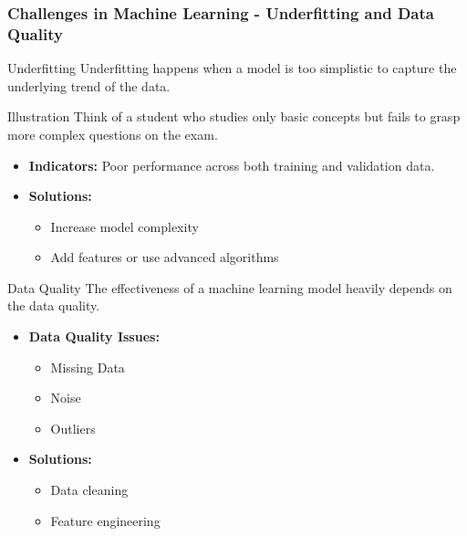 \documentclass[aspectratio=169]{beamer}
\begin{document}
\begin{frame}[fragile]
    \frametitle{Challenges in Machine Learning - Underfitting and Data Quality}
    \begin{block}{Underfitting}
        Underfitting happens when a model is too simplistic to capture the underlying trend of the data.
    \end{block}
    
    \begin{block}{Illustration}
        Think of a student who studies only basic concepts but fails to grasp more complex questions on the exam.
    \end{block}
    
    \begin{itemize}
        \item \textbf{Indicators:} Poor performance across both training and validation data.
        \item \textbf{Solutions:} 
            \begin{itemize}
                \item Increase model complexity
                \item Add features or use advanced algorithms
            \end{itemize}
    \end{itemize}
    
    \begin{block}{Data Quality}
        The effectiveness of a machine learning model heavily depends on the data quality.
    \end{block}
    
    \begin{itemize}
        \item \textbf{Data Quality Issues:} 
        \begin{itemize}
            \item Missing Data
            \item Noise
            \item Outliers
        \end{itemize}
        \item \textbf{Solutions:}
        \begin{itemize}
            \item Data cleaning
            \item Feature engineering
        \end{itemize}
    \end{itemize}
\end{frame}
\end{document}
